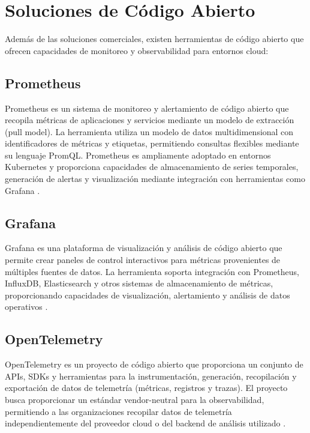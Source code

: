 \section{Soluciones de Código Abierto}

Además de las soluciones comerciales, existen herramientas de código abierto que ofrecen capacidades de monitoreo y observabilidad para entornos cloud:

\subsection{Prometheus}

Prometheus es un sistema de monitoreo y alertamiento de código abierto que recopila métricas de aplicaciones y servicios mediante un modelo de extracción (pull model). La herramienta utiliza un modelo de datos multidimensional con identificadores de métricas y etiquetas, permitiendo consultas flexibles mediante su lenguaje PromQL. Prometheus es ampliamente adoptado en entornos Kubernetes y proporciona capacidades de almacenamiento de series temporales, generación de alertas y visualización mediante integración con herramientas como Grafana \parencite{Prometheus2026}.

\subsection{Grafana}

Grafana es una plataforma de visualización y análisis de código abierto que permite crear paneles de control interactivos para métricas provenientes de múltiples fuentes de datos. La herramienta soporta integración con Prometheus, InfluxDB, Elasticsearch y otros sistemas de almacenamiento de métricas, proporcionando capacidades de visualización, alertamiento y análisis de datos operativos \parencite{Grafana2026}.

\subsection{OpenTelemetry}

OpenTelemetry es un proyecto de código abierto que proporciona un conjunto de APIs, SDKs y herramientas para la instrumentación, generación, recopilación y exportación de datos de telemetría (métricas, registros y trazas). El proyecto busca proporcionar un estándar vendor-neutral para la observabilidad, permitiendo a las organizaciones recopilar datos de telemetría independientemente del proveedor cloud o del backend de análisis utilizado \parencite{OpenTelemetry2026}.

